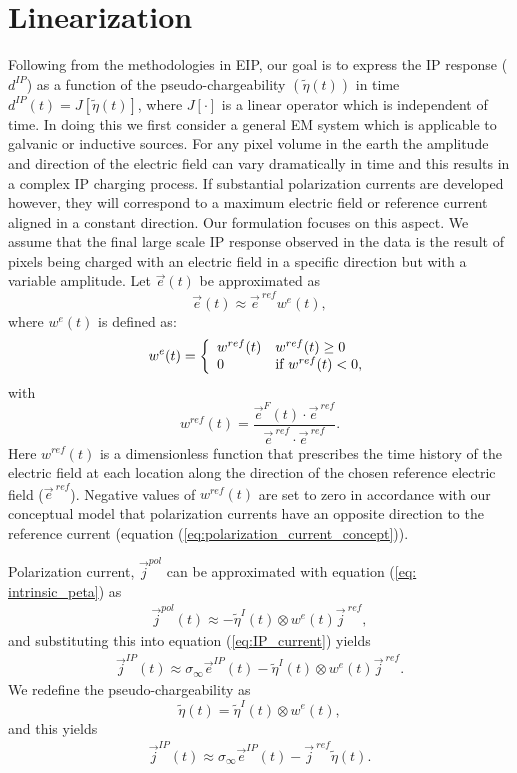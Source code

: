 \documentclass[a4paper, 11pt]{article}
\newcommand{\siginf}{\sigma_\infty}
\renewcommand {\j}  { {\vec j} }
\newcommand {\e}  { {\vec e} }
\newcommand{\peta}{\tilde{\eta}}
\newcommand{\eref}{\e^{\ ref}}
\newcommand{\jref}{\j^{\ ref}}
\newcommand{\dip}{d^{IP}}
\begin{document}
\section{Linearization}
Following from the methodologies in EIP, our goal is to express the IP response ($\dip$) as a function of the pseudo-chargeability $(\peta(t))$ in time  $\dip(t) = J[\peta(t)]$, where $J[\cdot]$ is a linear operator which is independent of time. In doing this we first consider a general EM system which is applicable to galvanic or inductive sources. 
For any pixel  volume in the earth the amplitude and direction of the  electric field can vary dramatically  in time and this results in a complex IP charging process. If substantial polarization currents are developed however, they will correspond to a maximum electric field or reference current aligned in a constant direction. Our formulation focuses on this aspect. We assume that the final large scale IP response observed in the data is the result of  pixels being charged with an electric field in a specific direction but with a variable amplitude. Let $\e(t)$ be approximated as
\begin{equation}
  \e(t) \approx \eref w^e(t),
  \label{eq: e_with_eref}
\end{equation}
where $w^e(t)$ is defined as:
\begin{equation}
  w^e(t) = \left\{ 
  \begin{array}{l l}
    w^{ref}(t) & w^{ref}(t) \ge 0 \\
    0 & \text{if } w^{ref}(t) < 0, 
  \end{array}\right.
  \label{eq: we}
\end{equation}
with
\begin{equation}
  w^{ref}(t) = \frac{\e^F(t)\cdot\eref}{\eref\cdot\eref}.
  \label{eq: wref}
\end{equation}
Here $w^{ref}(t)$ is a dimensionless function that prescribes the time history of the electric field at each location along the direction of the chosen reference electric field ($\eref$).  Negative values of  $w^{ref}(t)$ are set to zero in accordance with our conceptual model that polarization currents have an opposite direction to the reference current (equation (\ref{eq:polarization_current_concept})).

Polarization current, $\j^{pol}$ can be approximated with equation (\ref{eq: intrinsic_peta}) as
\begin{eqnarray}
  \j^{pol}(t) \approx - \peta^{I}(t)\otimes w^e(t)\jref,
\end{eqnarray}
and substituting this into equation (\ref{eq:IP_current}) yields
\begin{eqnarray}
  \j^{IP}(t) \approx \siginf\e^{IP}(t) - \peta^{I}(t)\otimes w^e(t)\jref.
\end{eqnarray}
We redefine the pseudo-chargeability as
\begin{equation}
    \peta(t) = \peta^{I}(t)\otimes w^e(t),
    \label{eq: pseudochargeability}
\end{equation}
and this yields
\begin{eqnarray}
  \j^{IP}(t) \approx \siginf\e^{IP}(t) -\jref\peta(t).
  \label{eq: jip_EMIP}
\end{eqnarray}
\end{document}
